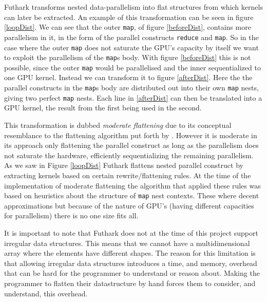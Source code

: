 \noindent Futhark transforms nested data-parallelism into flat structures from
which kernels can later be extracted. An example of this transformation can
be seen in figure \ref{loopDist}. We can see that the outer \texttt{map}, of
figure \ref{beforeDist}, contains more parallelism in it, in the form of the
parallel constructs \texttt{reduce} and \texttt{map}. So in the case where the
outer \texttt{map} does not saturate the GPU's capacity by itself we want to
exploit the parallelism of the \texttt{map}s body. With figure \ref{beforeDist}
this is not possible, since the outer \texttt{map} would be parallelised and
the inner sequentialized to one GPU kernel. Instead we can transform it to
figure \ref{afterDist}. Here the the parallel constructs in the \texttt{map}s
body are distributed out into their own \texttt{map} nests, giving two perfect
\texttt{map} nests. Each line in \ref{afterDist} can then be translated into a
GPU kernel, the result from the first being used in the second.

This transformation is dubbed \textit{moderate flattening}
\cite{futhark-nested-para} due to its conceptual resemblance to the flattening
algorithm put forth by \citeauthor{flat} \cite{flat}. However it is moderate in
its approach only flattening the parallel construct as long as the parallelism
does not saturate the hardware, efficiently sequentializing the remaining
parallelism. As we saw in Figure \ref{loopDist} Futhark flattens nested
parallel construct by extracting kernels based on certain rewrite/flattening
rules\cite{futhark-nested-para}. At the time of the implementation of moderate
flattening the algorithm that applied these rules was based on heuristics about
the structure of \texttt{map} nest contexts. These where decent approximations
but because of the nature of GPU's (having different capacities for
parallelism) there is no one size fits all.
 
It is important to note that Futhark does not at the time of this project 
support irregular data structures. This means that we cannot have a 
multidimensional array where the elements have different shapes. The reason for 
this limitation is that allowing irregular data structures introduces a time, 
and memory, overhead that can be hard for the programmer to understand or 
reason about. Making the programmer to flatten their datastructure by hand 
forces them to consider, and understand, this overhead.\cite{expansion} 


